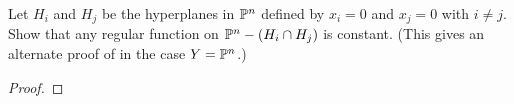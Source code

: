 \label{1.3.8}

Let $H_i$ and $H_j$ be the hyperplanes in $\P^n$ defined by $x_i = 0$ and $x_j = 0$ with $i \neq j$. Show that any regular function on $\P^n - (H_i \cap H_j)$ is constant. (This gives an alternate proof of \cite[I.3.4a]{hartshorne} in the case $Y = \P^n$.)

\begin{proof}

\end{proof}

